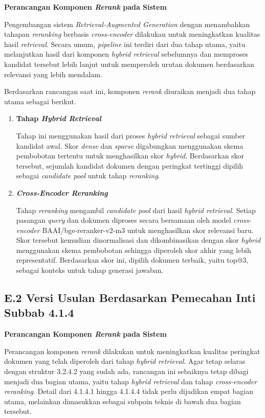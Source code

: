 \documentclass[12pt,a4paper]{article}
\begin{document}
\textbf{Perancangan Komponen \textit{Rerank} pada Sistem}

Pengembangan sistem \textit{Retrieval-Augmented Generation} dengan menambahkan tahapan \textit{reranking} berbasis \textit{cross-encoder} dilakukan untuk meningkatkan kualitas hasil \textit{retrieval}. Secara umum, \textit{pipeline} ini terdiri dari dua tahap utama, yaitu melanjutkan hasil dari komponen \textit{hybrid retrieval} sebelumnya dan memproses kandidat tersebut lebih lanjut untuk memperoleh urutan dokumen berdasarkan relevansi yang lebih mendalam.

Berdasarkan rancangan saat ini, komponen \textit{rerank} diuraikan menjadi dua tahap utama sebagai berikut.

\begin{enumerate}[leftmargin=1.1cm]
\item \textbf{Tahap \textit{Hybrid Retrieval}}

Tahap ini menggunakan hasil dari proses \textit{hybrid retrieval} sebagai sumber kandidat awal. Skor \textit{dense} dan \textit{sparse} digabungkan menggunakan skema pembobotan tertentu untuk menghasilkan skor \textit{hybrid}. Berdasarkan skor tersebut, sejumlah kandidat dokumen dengan peringkat tertinggi dipilih sebagai \textit{candidate pool} untuk tahap \textit{reranking}.

\item \textbf{\textit{Cross-Encoder Reranking}}

Tahap \textit{reranking} mengambil \textit{candidate pool} dari hasil \textit{hybrid retrieval}. Setiap pasangan \textit{query} dan dokumen diproses secara bersamaan oleh model \textit{cross-encoder} BAAI/bge-reranker-v2-m3 untuk menghasilkan skor relevansi baru. Skor tersebut kemudian dinormalisasi dan dikombinasikan dengan skor \textit{hybrid} menggunakan skema pembobotan sehingga diperoleh skor akhir yang lebih representatif. Berdasarkan skor ini, dipilih dokumen terbaik, yaitu top@3, sebagai konteks untuk tahap generasi jawaban.
\end{enumerate}


\subsection*{E.2 Versi Usulan Berdasarkan Pemecahan Inti Subbab 4.1.4}

\textbf{Perancangan Komponen \textit{Rerank} pada Sistem}

Perancangan komponen \textit{rerank} dilakukan untuk meningkatkan kualitas peringkat dokumen yang telah diperoleh dari tahap \textit{hybrid retrieval}. Agar tetap selaras dengan struktur 3.2.4.2 yang sudah ada, rancangan ini sebaiknya tetap dibagi menjadi dua bagian utama, yaitu tahap \textit{hybrid retrieval} dan tahap \textit{cross-encoder reranking}. Detail dari 4.1.4.1 hingga 4.1.4.4 tidak perlu dijadikan empat bagian utama, melainkan dimasukkan sebagai subpoin teknis di bawah dua bagian tersebut.
\end{document}
